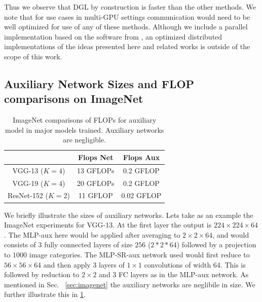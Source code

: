 \documentclass{article}
\begin{document}
Thus we observe that DGL by construction is faster than the other methods. We note that for use cases in multi-GPU settings communication would need to be well optimized for use of any of these methods. Although we include a parallel implementation based on the software from \citep{ddg}, an optimized distributed implementations of the ideas presented here and related works is outside of the scope of this work.  




\subsection{Auxiliary Network Sizes and FLOP comparisons on ImageNet}
\begin{table}[]
    \centering
    \begin{tabular}{c|c|c}
       & Flops Net & Flops Aux\\\hline
     VGG-13 ($K=4$) &13 GFLOPs & 0.2  GFLOP\\\hline
     VGG-19 ($K=4$) &20 GFLOPs & 0.2 GFLOP\\\hline
     ResNet-152 ($K=2$)  &   11 GFLOP &  0.02 GFLOP\\\hline
    \end{tabular}

    \caption{ImageNet comparisons of FLOPs for auxiliary model in major models trained. Auxiliary networks are negligible.}
    \label{tab:flop_im}
\end{table}
We briefly illustrate the sizes of auxiliary networks. Lets take as an example the ImageNet experiments for VGG-13. At the first layer the output is $224\times224\times64$. The MLP-aux here would be applied after averaging to $2\times2\times 64$, and would consists of 3 fully connected layers of size $256$ ($2*2*64$) followed by a projection to $1000$ image categories. The MLP-SR-aux network used would first reduce to $56\times56\times64$ and then apply 3 layers of $1\times1$ convolutions of width 64. This is followed by reduction to $2\times2$ and 3 FC layers as in the MLP-aux network. As mentioned in Sec. ~\ref{sec:imagenet} the auxiliary networks are neglibile in size. We further illustrate this in \ref{tab:flop_im}.
\end{document}
